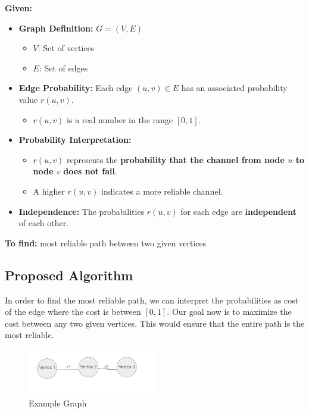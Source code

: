 \documentclass[11pt]{article}
\begin{document}
\textbf{Given:}
\begin{itemize}
    \item \textbf{Graph Definition:} \( G = (V, E) \)
    \begin{itemize}
        \item \( V \): Set of vertices 
        \item \( E \): Set of edges
    \end{itemize}
    
    \item \textbf{Edge Probability:} Each edge \( (u, v) \in E \) has an associated probability value \( r(u, v) \).
    \begin{itemize}
        \item \( r(u, v) \) is a real number in the range \([0, 1]\).
    \end{itemize}
    
    \item \textbf{Probability Interpretation:}
    \begin{itemize}
        \item \( r(u, v) \) represents the \textbf{probability that the channel from node \( u \) to node \( v \) }\textbf{does not fail}.
        \item A higher \( r(u, v) \) indicates a more reliable channel.
    \end{itemize}
    
    \item \textbf{Independence:} The probabilities \( r(u, v) \) for each edge are \textbf{independent} of each other.
\end{itemize}


\textbf{To find:} most reliable path between two given vertices

\subsection*{Proposed Algorithm }
In order to find the most reliable path, we can interpret the probabilities as cost of the edge where the cost is between \([0, 1]\). Our goal now is to maximize the cost between any two given vertices. This would ensure that the entire path is the most reliable. 

\begin{figure}[h]
    \centering
    \includegraphics[width=0.5\textwidth]{arp_q2.png}
    \caption{Example Graph}
    \label{fig:example}
\end{figure}
\end{document}

